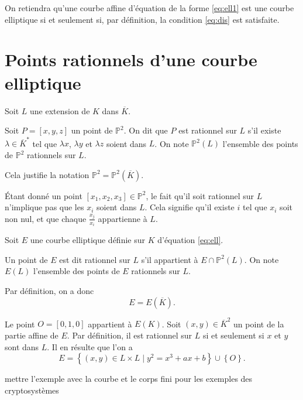 \begin{remarque}
    On retiendra qu'une courbe affine d'équation de la forme \eqref{eq:ell1} est une courbe elliptique si et seulement si, par définition, la condition \eqref{eq:dis} est satisfaite.
\end{remarque}

\section{Points rationnels d'une courbe elliptique}

Soit $L$ une extension de $K$ dans $\overline{K}$.

\begin{definition}
    Soit $P=\left[ x,y,z \right] $ un point de $\mathbb{P}^2$. On dit que $P$ est rationnel sur $L$ s'il existe $\lambda \in \overline{K}^{*}$ tel que $\lambda x$, $\lambda y$ et $\lambda z$ soient dans $L$. On note $\mathbb{P}^2(L)$ l'ensemble des points de $\mathbb{P}^2$ rationnels sur $L$.

    Cela justifie la notation $\mathbb{P}^2 = \mathbb{P}^2(\overline{K})$.
\end{definition}

\begin{remarque}
    Étant donné un point $[x_1,x_2,x_3] \in \mathbb{P}^2$, le fait qu'il soit rationnel sur $L$ n'implique pas que les $x_{i}$ soient dans $L$. Cela signifie qu'il existe $i$ tel que $x_{i}$ soit non nul, et que chaque $\frac{x_{j}}{x_{i}}$ appartienne à $L$.
\end{remarque}

Soit $E$ une courbe elliptique définie sur $K$ d'équation \eqref{eq:ell}.

\begin{definition}
    Un point de $E$ est dit rationnel sur $L$ s'il appartient à $E \cap \mathbb{P}^2(L)$. On note $E(L)$ l'ensemble des points de $E$ rationnels sur $L$.

    Par définition, on a donc
    \[
    E = E(\overline{K})
    .\] 
\end{definition}

Le point $O = [0,1,0]$ appartient à $E(K)$. Soit $(x,y) \in \overline{K}^2$ un point de la partie affine de $E$. Par définition, il est rationnel sur $L$ si et seulement si $x$ et $y$ sont dans $L$. Il en résulte que l'on a 
\[
E = \left\{ (x,y) \in L \times L \mid y^2 = x^3+ax+b \right\} \cup \left\{ O \right\} 
.\] 

\begin{exemple}
    mettre l'exemple avec la courbe et le corps fini pour les exemples des cryptosystèmes
\end{exemple}
